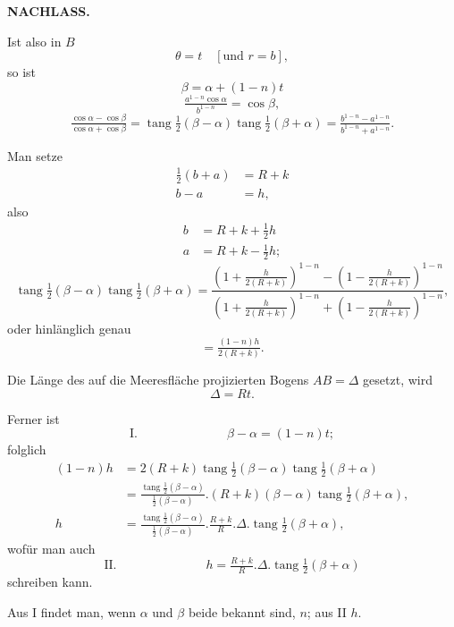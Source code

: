 \par\clearpage
\noindent{}\hfill{\small\textbf{NACHLASS.}}\hfill\null\par\medskip
\begingroup
\setlength{\abovedisplayskip}{4pt}\setlength{\belowdisplayskip}{4pt}
\setlength{\abovedisplayshortskip}{2pt}\setlength{\belowdisplayshortskip}{2pt}
\par\noindent\hspace*{\parindent}Ist also in \(B\)
\[\theta=t\quad[\text{und }r=b],\]
\noindent so ist
\[\beta=\alpha+(1-n)t\]
\noindent [und]
\[\tfrac{a^{1-n}\cos\alpha}{b^{1-n}}=\cos\beta,\]
\[\tfrac{\cos\alpha-\cos\beta}{\cos\alpha+\cos\beta}=\operatorname{tang}\tfrac12(\beta-\alpha)\operatorname{tang}\tfrac12(\beta+\alpha)=\tfrac{b^{1-n}-a^{1-n}}{b^{1-n}+a^{1-n}}.\]
\par\noindent\hspace*{\parindent}Man setze
\[\begin{aligned}\tfrac12(b+a)&=R+k\\b-a&=h,\end{aligned}\]
\noindent also
\[\begin{aligned}b&=R+k+\tfrac12h\\a&=R+k-\tfrac12h;\end{aligned}\]
\[\operatorname{tang}\tfrac12(\beta-\alpha)\operatorname{tang}\tfrac12(\beta+\alpha)=\frac{\left(1+\tfrac{h}{2(R+k)}\right)^{1-n}-\left(1-\tfrac{h}{2(R+k)}\right)^{1-n}}{\left(1+\tfrac{h}{2(R+k)}\right)^{1-n}+\left(1-\tfrac{h}{2(R+k)}\right)^{1-n}},\]
\noindent oder hinlänglich genau
\[=\tfrac{(1-n)h}{2(R+k)}.\]
\par\noindent\hspace*{\parindent}Die Länge des auf die Meeresfläche projizierten Bogens \(AB=\Delta\) gesetzt, wird
\[\Delta=Rt.\]
\par\noindent\hspace*{\parindent}Ferner ist
\[\text{I.}\hspace{3cm}\beta-\alpha=(1-n)t;\]
\noindent folglich
\[\begin{aligned}
(1-n)h&=2(R+k)\operatorname{tang}\tfrac12(\beta-\alpha)\operatorname{tang}\tfrac12(\beta+\alpha)\\
&=\tfrac{\operatorname{tang}\frac12(\beta-\alpha)}{\frac12(\beta-\alpha)}.(R+k)(\beta-\alpha)\operatorname{tang}\tfrac12(\beta+\alpha),\\
h&=\tfrac{\operatorname{tang}\frac12(\beta-\alpha)}{\frac12(\beta-\alpha)}.\tfrac{R+k}{R}.\Delta.\operatorname{tang}\tfrac12(\beta+\alpha),
\end{aligned}\]
\noindent wofür man auch
\[\text{II.}\hspace{3cm}h=\tfrac{R+k}{R}.\Delta.\operatorname{tang}\tfrac12(\beta+\alpha)\]
\noindent schreiben kann.
\par\noindent\hspace*{\parindent}Aus I findet man, wenn \(\alpha\) und \(\beta\) beide bekannt sind, \(n\); aus II \(h\).
\endgroup

